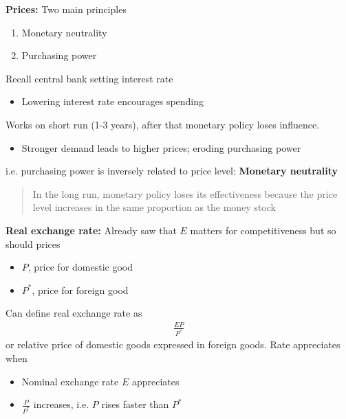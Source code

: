 \documentclass{beamer}
\begin{document}
\begin{frame}
  \textbf{Prices:} Two main principles
  \begin{enumerate}
    \item Monetary neutrality
    \item Purchasing power
  \end{enumerate}
  Recall central bank setting interest rate
  \begin{itemize}
    \item Lowering interest rate encourages spending    
  \end{itemize}
  Works on short run (1-3 years), after that monetary policy loses influence. 
  \begin{itemize}
    \item Stronger demand leads to higher prices; eroding purchasing power
  \end{itemize}
  i.e. purchasing power is inversely related to price level: \textbf{Monetary neutrality}
  \begin{quote}
    In the long run, monetary policy loses its effectiveness because the price level increases in the same proportion as the money stock
  \end{quote}
\end{frame}

\begin{frame} 
  \textbf{Real exchange rate:} Already saw that $E$ matters for competitiveness but so should prices
  \begin{itemize}
    \item $P$, price for domestic good
    \item $P^*$, price for foreign good
  \end{itemize}
  Can define real exchange rate as
  \begin{align}
    \frac{EP}{P^*}
  \end{align}
  or relative price of domestic goods expressed in foreign goods.
  Rate appreciates when
  \begin{itemize}
    \item Nominal exchange rate $E$ appreciates
    \item $\frac{P}{P^*}$ increases, i.e. $P$ rises faster than $P^*$
  \end{itemize}
\end{frame}
\end{document}
